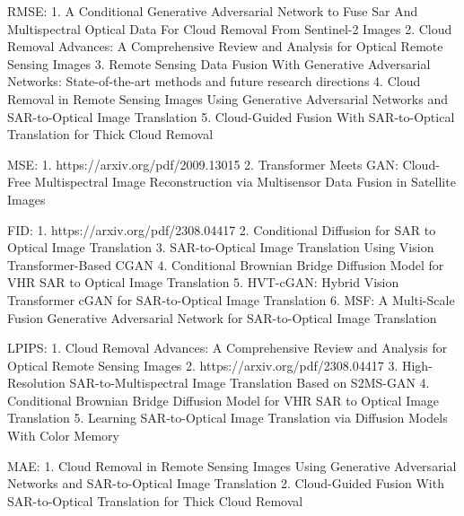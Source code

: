 RMSE: 
1.	A Conditional Generative Adversarial Network to Fuse Sar And Multispectral Optical Data For Cloud Removal From Sentinel-2 Images
2.	Cloud Removal Advances: A Comprehensive Review and Analysis for Optical Remote Sensing Images
3.	Remote Sensing Data Fusion With Generative Adversarial Networks: State-of-the-art methods and future research directions
4.	Cloud Removal in Remote Sensing Images Using Generative Adversarial Networks and SAR-to-Optical Image Translation
5.	Cloud-Guided Fusion With SAR-to-Optical Translation for Thick Cloud Removal

MSE:
1.	https://arxiv.org/pdf/2009.13015 
2.	Transformer Meets GAN: Cloud-Free Multispectral Image Reconstruction via Multisensor Data Fusion in Satellite Images

FID:
1.	https://arxiv.org/pdf/2308.04417
2.	Conditional Diffusion for SAR to Optical Image Translation
3.	SAR-to-Optical Image Translation Using Vision Transformer-Based CGAN
4.	Conditional Brownian Bridge Diffusion Model for VHR SAR to Optical Image Translation
5.	HVT-cGAN: Hybrid Vision Transformer cGAN for SAR-to-Optical Image Translation
6.	MSF: A Multi-Scale Fusion Generative Adversarial Network for SAR-to-Optical Image Translation

LPIPS:
1.	Cloud Removal Advances: A Comprehensive Review and Analysis for Optical Remote Sensing Images
2.	https://arxiv.org/pdf/2308.04417
3.	High-Resolution SAR-to-Multispectral Image Translation Based on S2MS-GAN
4.	Conditional Brownian Bridge Diffusion Model for VHR SAR to Optical Image Translation
5.	Learning SAR-to-Optical Image Translation via Diffusion Models With Color Memory

MAE:
1.	Cloud Removal in Remote Sensing Images Using Generative Adversarial Networks and SAR-to-Optical Image Translation
2.	Cloud-Guided Fusion With SAR-to-Optical Translation for Thick Cloud Removal
